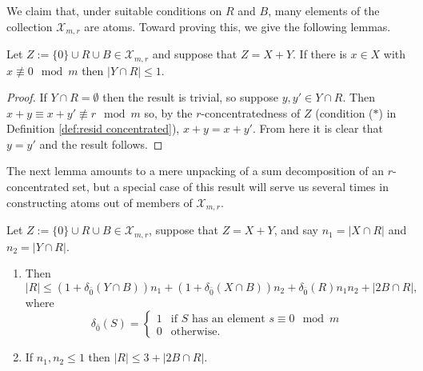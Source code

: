 We claim that, under suitable conditions on $R$ and $B$, many elements of the collection $\mathcal{X}_{m,r}$ are atoms.  
Toward proving this, we give the following lemmas.

\begin{lemma} \label{lem:other summand small}
Let $Z := \{0\}\cup R \cup B\in \mathcal{X}_{m,r}$ and suppose that $Z = X+Y$.
If there is $x\in X$ with $x\not\equiv 0 \mod m$ then $|Y\cap R| \le 1$.
\end{lemma}

\begin{proof}
If $Y\cap R=\emptyset$ then the result is trivial, so suppose $y,y'\in Y\cap R$.
Then $x+y \equiv x+y' \not\equiv r \mod m$ so, by the $r$-concentratedness of $Z$ (condition ($*$) in Definition \ref{def:resid concentrated}), $x+y = x+y'$.
From here it is clear that $y=y'$ and the result follows.
\end{proof}

The next lemma amounts to a mere unpacking of a sum decomposition of an $r$-concentrated set, but a special case of this result will serve us several times in constructing atoms out of members of $\mathcal{X}_{m,r}$.

\begin{lemma} \label{lem:both summands small}
Let $Z := \{0\}\cup R \cup B\in \mathcal{X}_{m,r}$, suppose that $Z = X + Y$, and say $n_1 = |X\cap R|$ and $n_2 = |Y\cap R|$.
\begin{enumerate}[label={\rm (\roman{*})}]
\item Then 
\[|R| \le (1+\delta_{\bar{0}}(Y\cap B))n_1 + (1+\delta_{\bar{0}}(X\cap B))n_2 + \delta_{\bar{0}}(R)n_1n_2 + |2B \cap R|,\]
where 
\[\delta_{\bar{0}}(S) = 
\begin{cases}
1& \textrm{if $S$ has an element $s \equiv 0 \mod m$} \\
0& \textrm{otherwise}.
\end{cases}\]
\item If $n_1,n_2 \le 1$ then $|R| \le 3 + |2B\cap R|$.
\end{enumerate}
\end{lemma}

